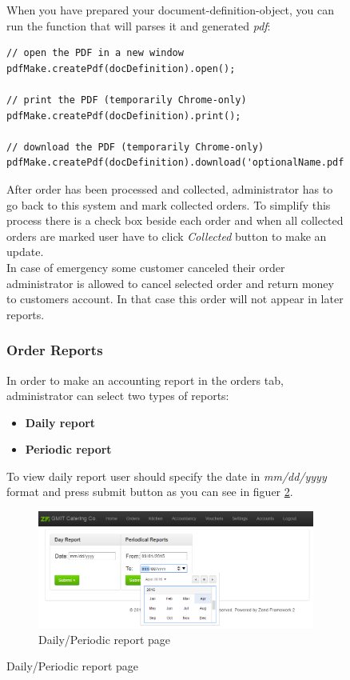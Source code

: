 \begin{figure}
			
			When you have prepared your document-definition-object, you can run the function that will parses it and generated \textit{pdf}:
			\\
			
			\begin{verbatim}
// open the PDF in a new window
pdfMake.createPdf(docDefinition).open();
 
// print the PDF (temporarily Chrome-only)
pdfMake.createPdf(docDefinition).print();
 
// download the PDF (temporarily Chrome-only)
pdfMake.createPdf(docDefinition).download('optionalName.pdf');
			\end{verbatim}
			
			After order has been processed and collected, administrator has to go back to this system and mark collected orders. To simplify this process there is a check box beside each order and when all collected orders are marked user have to click \textit{Collected} button to make an update.
			\\
			In case of emergency some customer canceled their order administrator is allowed to cancel selected order and return money to customers account. In that case this order will not appear in later reports.
			
		\subsubsection{Order Reports}
			In order to make an accounting report in the orders tab, administrator can select two types of reports:
			\begin{itemize}
				\item \textbf{Daily report}
				\item \textbf{Periodic report}
			\end{itemize} 
			
			To view daily report user should specify the date in \textit{mm/dd/yyyy} format and press submit button as you can see in figuer \ref{fig:select-report-page}. 
			
			\begin{figure}[H]
				\centering
				\includegraphics[width=1\textwidth]{img/zf2/01-canteen_select_periodic_report_page.png}
				\caption{Daily/Periodic report page}
				\label{fig:select-report-page}
			\end{figure}
			

\end{figure}
